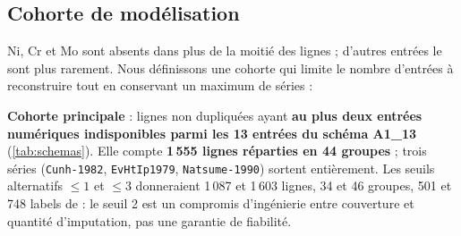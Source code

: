 \subsection{Cohorte de modélisation}
\label{subsec:cohorte}

Ni, Cr et Mo sont absents dans plus de la moitié des lignes ; d'autres entrées
le sont plus rarement. Nous définissons une cohorte qui limite le nombre
d'entrées à reconstruire tout en conservant un maximum de séries :

\begin{decision}
\textbf{Cohorte principale} : lignes non dupliquées ayant \textbf{au plus deux
entrées numériques indisponibles parmi les 13 entrées du schéma A1\_13}
(\cref{tab:schemas}). Elle compte \textbf{1\,555 lignes réparties en 44 groupes} ;
trois séries (\texttt{Cunh-1982}, \texttt{EvHtIp1979}, \texttt{Natsume-1990})
sortent entièrement. Les seuils alternatifs $\leq 1$ et $\leq 3$ donneraient
1\,087 et 1\,603 lignes, 34 et 46 groupes, 501 et 748 labels de \YS{} : le
seuil 2 est un compromis d'ingénierie entre couverture et quantité d'imputation,
pas une garantie de fiabilité.
\end{decision}

